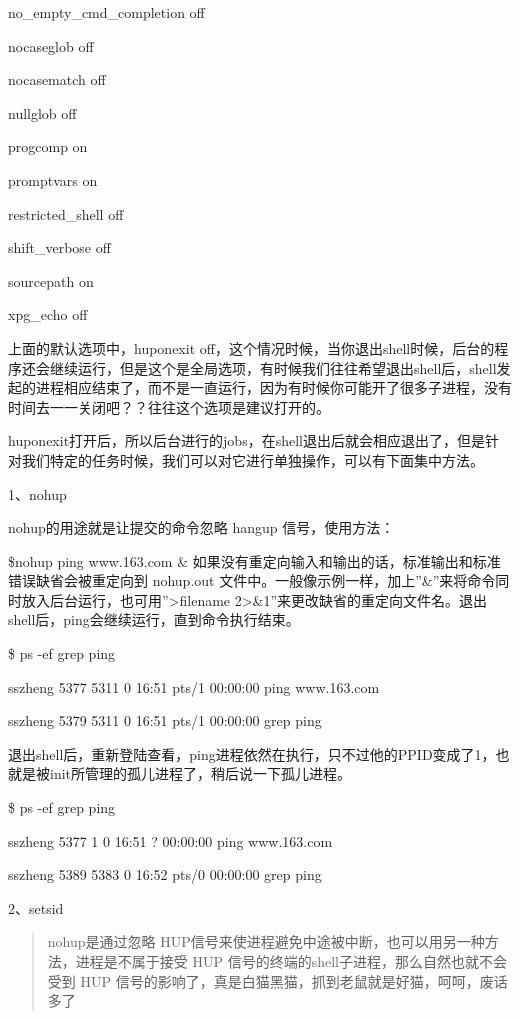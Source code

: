 \documentclass[letterpaper,10pt]{sphinxmanual}
\begin{document}
no\_empty\_cmd\_completion off

nocaseglob      off

nocasematch     off

nullglob        off

progcomp        on

promptvars      on

restricted\_shell    off

shift\_verbose   off

sourcepath      on

xpg\_echo        off

上面的默认选项中，huponexit off，这个情况时候，当你退出shell时候，后台的程序还会继续运行，但是这个是全局选项，有时候我们往往希望退出shell后，shell发起的进程相应结束了，而不是一直运行，因为有时候你可能开了很多子进程，没有时间去一一关闭吧？？往往这个选项是建议打开的。

huponexit打开后，所以后台进行的jobs，在shell退出后就会相应退出了，但是针对我们特定的任务时候，我们可以对它进行单独操作，可以有下面集中方法。

1、nohup

nohup的用途就是让提交的命令忽略 hangup 信号，使用方法：

\$nohup ping www.163.com \&
如果没有重定向输入和输出的话，标准输出和标准错误缺省会被重定向到 nohup.out 文件中。一般像示例一样，加上''\&''来将命令同时放入后台运行，也可用''\textgreater{}filename 2\textgreater{}\&1''来更改缺省的重定向文件名。退出shell后，ping会继续运行，直到命令执行结束。

\$ ps -ef {\color{red}\bfseries{}\textbar{}}grep ping

sszheng   5377 5311 0 16:51 pts/1    00:00:00 ping www.163.com

sszheng   5379 5311 0 16:51 pts/1    00:00:00 grep ping

退出shell后，重新登陆查看，ping进程依然在执行，只不过他的PPID变成了1，也就是被init所管理的孤儿进程了，稍后说一下孤儿进程。

\$ ps -ef {\color{red}\bfseries{}\textbar{}}grep ping

sszheng   5377     1 0 16:51 ?        00:00:00 ping www.163.com

sszheng   5389 5383 0 16:52 pts/0    00:00:00 grep ping

2、setsid
\begin{quote}

nohup是通过忽略 HUP信号来使进程避免中途被中断，也可以用另一种方法，进程是不属于接受 HUP 信号的终端的shell子进程，那么自然也就不会受到 HUP 信号的影响了，真是白猫黑猫，抓到老鼠就是好猫，呵呵，废话多了
\end{quote}
\end{document}
